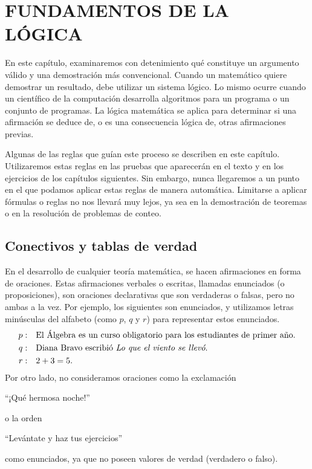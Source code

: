 \chapter{FUNDAMENTOS DE LA LÓGICA}
\printchaptertableofcontents

En este capítulo, examinaremos con detenimiento qué constituye un argumento válido y una demostración más convencional. Cuando un matemático quiere demostrar un resultado, debe utilizar un sistema lógico. Lo mismo ocurre cuando un científico de la computación desarrolla algoritmos para un programa o un conjunto de programas. La lógica matemática se aplica para determinar si una afirmación se deduce de, o es una consecuencia lógica de, otras afirmaciones previas.

Algunas de las reglas que guían este proceso se describen en este capítulo. Utilizaremos estas reglas en las pruebas que aparecerán en el texto y en los ejercicios de los capítulos siguientes. Sin embargo, nunca llegaremos a un punto en el que podamos aplicar estas reglas de manera automática. Limitarse a aplicar fórmulas o reglas no nos llevará muy lejos, ya sea en la demostración de teoremas o en la resolución de problemas de conteo.

\section{Conectivos y tablas de verdad}

En el desarrollo de cualquier teoría matemática, se hacen afirmaciones en forma de oraciones. Estas afirmaciones verbales o escritas, llamadas enunciados (o proposiciones), son oraciones declarativas que son verdaderas o falsas, pero no ambas a la vez. Por ejemplo, los siguientes son enunciados, y utilizamos letras minúsculas del alfabeto (como $p$, $q$ y $r$) para representar estos enunciados.
\begin{align*}
    p: & \quad \text{El Álgebra es un curso obligatorio para los estudiantes de primer año.} \\
    q: & \quad \text{Diana Bravo escribió \emph{Lo que el viento se llevó}.} \\
    r: & \quad 2 + 3 = 5.
\end{align*}\newpage\noindent
Por otro lado, no consideramos oraciones como la exclamación
\begin{nscenter}
    “¡Qué hermosa noche!”
\end{nscenter}
o la orden
\begin{nscenter}
    “Levántate y haz tus ejercicios”
\end{nscenter}
como enunciados, ya que no poseen valores de verdad (verdadero o falso).

